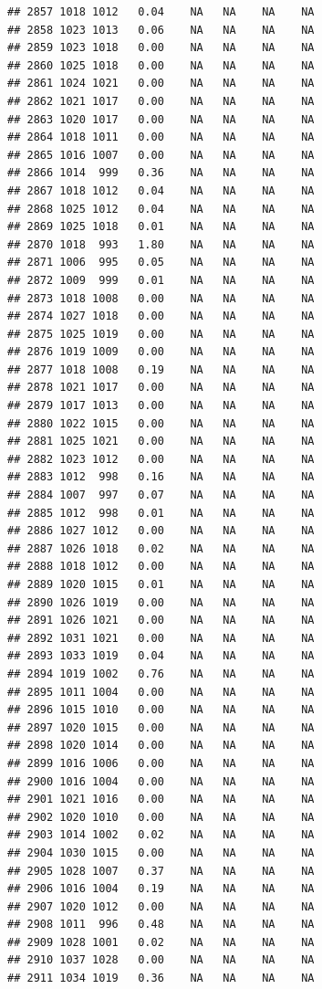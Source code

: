\documentclass{article}\usepackage{graphicx, color}
\makeatletter
\newenvironment{kframe}{%
 \def\at@end@of@kframe{}%
 \ifinner\ifhmode%
  \def\at@end@of@kframe{\end{minipage}}%
  \begin{minipage}{\columnwidth}%
 \fi\fi%
 \def\FrameCommand##1{\hskip\@totalleftmargin \hskip-\fboxsep
 \colorbox{shadecolor}{##1}\hskip-\fboxsep
     \hskip-\linewidth \hskip-\@totalleftmargin \hskip\columnwidth}%
 \MakeFramed {\advance\hsize-\width
   \@totalleftmargin\z@ \linewidth\hsize
   \@setminipage}}%
 {\par\unskip\endMakeFramed%
 \at@end@of@kframe}
\newenvironment{knitrout}{}{} %
\makeatother
\begin{document}
\begin{knitrout}
\begin{kframe}
\begin{verbatim}
## 2857 1018 1012   0.04    NA   NA    NA    NA
## 2858 1023 1013   0.06    NA   NA    NA    NA
## 2859 1023 1018   0.00    NA   NA    NA    NA
## 2860 1025 1018   0.00    NA   NA    NA    NA
## 2861 1024 1021   0.00    NA   NA    NA    NA
## 2862 1021 1017   0.00    NA   NA    NA    NA
## 2863 1020 1017   0.00    NA   NA    NA    NA
## 2864 1018 1011   0.00    NA   NA    NA    NA
## 2865 1016 1007   0.00    NA   NA    NA    NA
## 2866 1014  999   0.36    NA   NA    NA    NA
## 2867 1018 1012   0.04    NA   NA    NA    NA
## 2868 1025 1012   0.04    NA   NA    NA    NA
## 2869 1025 1018   0.01    NA   NA    NA    NA
## 2870 1018  993   1.80    NA   NA    NA    NA
## 2871 1006  995   0.05    NA   NA    NA    NA
## 2872 1009  999   0.01    NA   NA    NA    NA
## 2873 1018 1008   0.00    NA   NA    NA    NA
## 2874 1027 1018   0.00    NA   NA    NA    NA
## 2875 1025 1019   0.00    NA   NA    NA    NA
## 2876 1019 1009   0.00    NA   NA    NA    NA
## 2877 1018 1008   0.19    NA   NA    NA    NA
## 2878 1021 1017   0.00    NA   NA    NA    NA
## 2879 1017 1013   0.00    NA   NA    NA    NA
## 2880 1022 1015   0.00    NA   NA    NA    NA
## 2881 1025 1021   0.00    NA   NA    NA    NA
## 2882 1023 1012   0.00    NA   NA    NA    NA
## 2883 1012  998   0.16    NA   NA    NA    NA
## 2884 1007  997   0.07    NA   NA    NA    NA
## 2885 1012  998   0.01    NA   NA    NA    NA
## 2886 1027 1012   0.00    NA   NA    NA    NA
## 2887 1026 1018   0.02    NA   NA    NA    NA
## 2888 1018 1012   0.00    NA   NA    NA    NA
## 2889 1020 1015   0.01    NA   NA    NA    NA
## 2890 1026 1019   0.00    NA   NA    NA    NA
## 2891 1026 1021   0.00    NA   NA    NA    NA
## 2892 1031 1021   0.00    NA   NA    NA    NA
## 2893 1033 1019   0.04    NA   NA    NA    NA
## 2894 1019 1002   0.76    NA   NA    NA    NA
## 2895 1011 1004   0.00    NA   NA    NA    NA
## 2896 1015 1010   0.00    NA   NA    NA    NA
## 2897 1020 1015   0.00    NA   NA    NA    NA
## 2898 1020 1014   0.00    NA   NA    NA    NA
## 2899 1016 1006   0.00    NA   NA    NA    NA
## 2900 1016 1004   0.00    NA   NA    NA    NA
## 2901 1021 1016   0.00    NA   NA    NA    NA
## 2902 1020 1010   0.00    NA   NA    NA    NA
## 2903 1014 1002   0.02    NA   NA    NA    NA
## 2904 1030 1015   0.00    NA   NA    NA    NA
## 2905 1028 1007   0.37    NA   NA    NA    NA
## 2906 1016 1004   0.19    NA   NA    NA    NA
## 2907 1020 1012   0.00    NA   NA    NA    NA
## 2908 1011  996   0.48    NA   NA    NA    NA
## 2909 1028 1001   0.02    NA   NA    NA    NA
## 2910 1037 1028   0.00    NA   NA    NA    NA
## 2911 1034 1019   0.36    NA   NA    NA    NA

\end{verbatim}
\end{kframe}
\end{knitrout}
\end{document}

